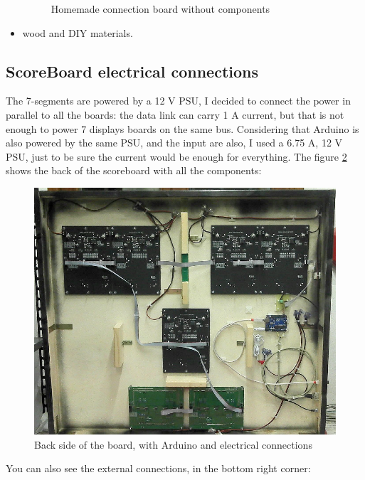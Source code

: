 \documentclass[11pt,english]{article}
\begin{document}
\begin{itemize}
\begin{figure}[H]
  \caption{Homemade connection board without components \label{fig:board}}

  \end{figure}
 
 \item wood and DIY materials.
 
\end{itemize}


\subsection{ScoreBoard electrical connections}

The 7-segments are powered by a 12 V PSU, I decided to connect the power in parallel to all the boards:
the data link can carry 1 A current, but that is not enough to power 7 displays boards on the same bus.
Considering that Arduino is also powered by the same PSU, and the input are also, I used a 6.75 A, 12 V
PSU, just to be sure the current would be enough for everything.
The figure \ref{fig:board-back} shows the back of the scoreboard with all the components:

%
\begin{figure}[htb]
\centering\includegraphics[scale=0.42]{img/Board-back}

\caption{Back side of the board, with Arduino and electrical connections \label{fig:board-back}}

\end{figure}

You can also see the external connections, in the bottom right corner:
\end{document}
